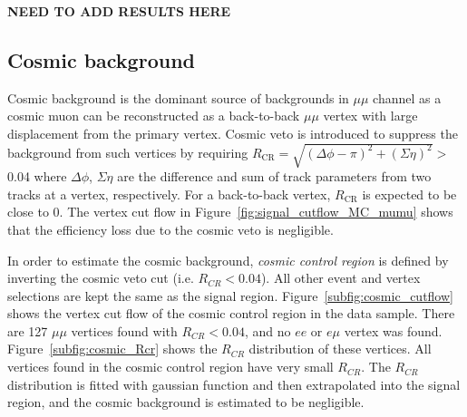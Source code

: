 \textbf{NEED TO ADD RESULTS HERE}

\newpage






\subsection{Cosmic background}
\label{sec:cosmic_ray}
Cosmic background is the dominant source of backgrounds in $\mu\mu$ channel as a cosmic muon can be reconstructed as a back-to-back $\mu\mu$ vertex with large displacement from the primary vertex. Cosmic veto is introduced to suppress the background from such vertices by requiring $R_{\mathrm{CR}} = \sqrt{(\Delta \phi - \pi)^{2} + (\Sigma \eta)^{2}} >$ 0.04 where $\Delta \phi$, $\Sigma \eta$ are the difference and sum of track parameters from two tracks at a vertex, respectively. For a back-to-back vertex, $R_{\mathrm{CR}}$ is expected to be close to 0. The vertex cut flow in Figure~\ref{fig:signal_cutflow_MC_mumu} shows that the efficiency loss due to the cosmic veto is negligible.

In order to estimate the cosmic background, \textit{cosmic control region} is defined by inverting the cosmic veto cut (i.e. $R_{CR} < 0.04$). All other event and vertex selections are kept the same as the signal region. Figure~\ref{subfig:cosmic_cutflow} shows the vertex cut flow of the cosmic control region in the data sample. There are 127 $\mu\mu$ vertices found with $R_{CR} < 0.04$, and no $ee$ or $e\mu$ vertex was found. Figure~\ref{subfig:cosmic_Rcr} shows the $R_{CR}$ distribution of these vertices. All vertices found in the cosmic control region have very small $R_{CR}$. The $R_{CR}$ distribution is fitted with gaussian function and then extrapolated into the signal region, and the cosmic background is estimated to be negligible.





